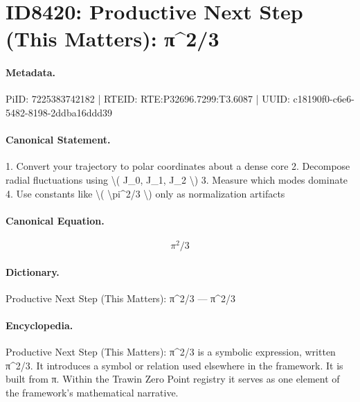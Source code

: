 \section*{ID8420: Productive Next Step (This Matters): π\textasciicircum{}2/3}
\paragraph{Metadata.}
PiID: 7225383742182 | RTEID: RTE:P32696.7299:T3.6087 | UUID: c18190f0-c6e6-5482-8198-2ddba16ddd39

\paragraph{Canonical Statement.}
1. Convert your trajectory to polar coordinates about a dense core 2. Decompose radial fluctuations using \textbackslash{}( J\_0, J\_1, J\_2 \textbackslash{}) 3. Measure which modes dominate 4. Use constants like \textbackslash{}( \textbackslash{}pi\textasciicircum{}2/3 \textbackslash{}) only as normalization artifacts

\paragraph{Canonical Equation.}
\[
\pi^2/3
\]

\paragraph{Dictionary.}
Productive Next Step (This Matters): π\textasciicircum{}2/3 — π\textasciicircum{}2/3

\paragraph{Encyclopedia.}
Productive Next Step (This Matters): π\textasciicircum{}2/3 is a symbolic expression, written π\textasciicircum{}2/3. It introduces a symbol or relation used elsewhere in the framework. It is built from π. Within the Trawin Zero Point registry it serves as one element of the framework's mathematical narrative.
